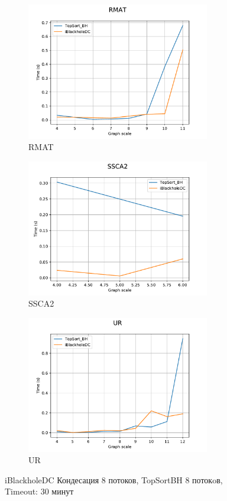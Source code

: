 \documentclass[12pt,a4paper,oneside,openany]{article}
\theoremstyle{definition}
\theoremstyle{lemma}
\theoremstyle{remark}
\begin{document}
\begin{figure}[H]
    \begin{subfigure}{.5\textwidth}
      \centering
      \includegraphics[width=8cm]{images/4_RMAT.pdf}
      \caption{RMAT}
      \label{fig:chinesecond:rmat}
    \end{subfigure}
    \begin{subfigure}{.5\textwidth}
      \centering
      \includegraphics[width=8cm]{images/4_SSCA2.pdf}
      \caption{SSCA2}
      \label{fig:chinesecond:ssca}
    \end{subfigure}
    \begin{subfigure}{.5\textwidth}
      \centering
      \includegraphics[width=8cm]{images/4_UR.pdf}
      \caption{UR}
      \label{fig:chinesecond:ur}
    \end{subfigure}
    \caption{iBlackholeDC Кондесация 8 потоков, TopSortBH 8 потокoв, Timeout: 30 минут}
    \label{fig:chinesecond}
\end{figure}
\end{document}
